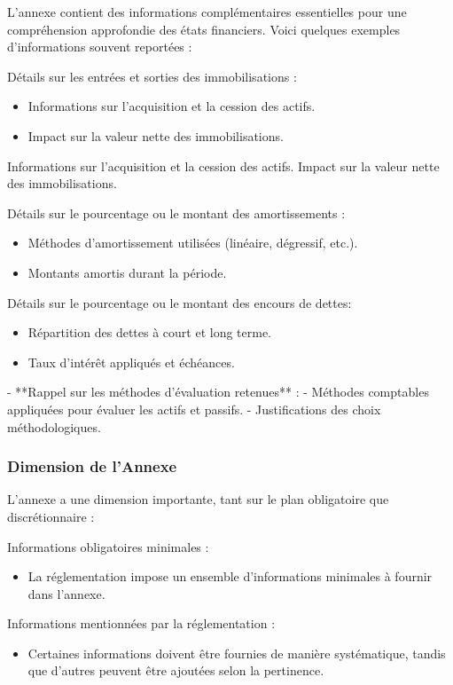 \documentclass[a4paper, 12pt]{report}
\begin{document}
L'annexe contient des informations complémentaires essentielles pour une compréhension approfondie des états financiers. Voici quelques exemples d'informations souvent reportées :

Détails sur les entrées et sorties des immobilisations :

\begin{itemize}
	\item Informations sur l'acquisition et la cession des actifs.
	\item Impact sur la valeur nette des immobilisations.
\end{itemize}

Informations sur l'acquisition et la cession des actifs.
Impact sur la valeur nette des immobilisations.

Détails sur le pourcentage ou le montant des amortissements :
\begin{itemize}
	\item Méthodes d'amortissement utilisées (linéaire, dégressif, etc.).
	\item Montants amortis durant la période.
\end{itemize}

Détails sur le pourcentage ou le montant des encours de dettes:

\begin{itemize}
	\item Répartition des dettes à court et long terme.
	\item Taux d'intérêt appliqués et échéances.
\end{itemize}

- **Rappel sur les méthodes d'évaluation retenues** :
- Méthodes comptables appliquées pour évaluer les actifs et passifs.
- Justifications des choix méthodologiques.

\subsubsection{Dimension de l'Annexe}

L'annexe a une dimension importante, tant sur le plan obligatoire que discrétionnaire :

Informations obligatoires minimales :
\begin{itemize}
	\item La réglementation impose un ensemble d'informations minimales à fournir dans l'annexe.
\end{itemize}

Informations mentionnées par la réglementation :
\begin{itemize}
	\item Certaines informations doivent être fournies de manière systématique, tandis que d'autres peuvent être ajoutées selon la pertinence.
\end{itemize}
\end{document}
